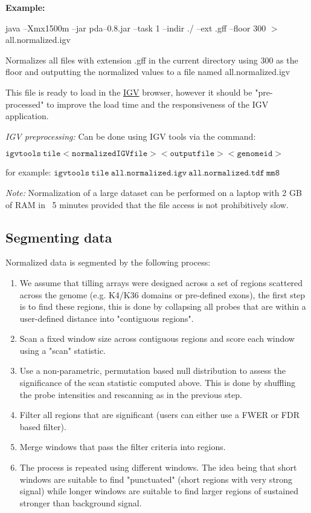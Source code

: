 \documentclass[11pt]{article}
\begin{document}
{\bf Example:}


java --Xmx1500m  --jar pda--0.8.jar --task 1 --indir ./ --ext .gff --floor 300 $>$ all.normalized.igv

Normalizes all files with extension .gff in the current directory using 300 as the floor and outputting the normalized values to a file named all.normalized.igv

This file is ready to load in the  \href{http://www.broadinstitute.org/igv/}{IGV}  browser, however it should be "pre-processed" to improve the load time and the responsiveness of the IGV application.

{\em IGV preprocessing:} Can be done using IGV tools via the command:

$\mathtt{igvtools\ tile <normalized IGV file> <output file> <genome id>} $  

for example:
$\mathtt{igvtools\ tile\ all.normalized.igv\ all.normalized.tdf\ mm8} $ 

{\em Note:} Normalization of a large dataset can be performed on a laptop with 2 GB of RAM in ~5 minutes provided that the file access is not prohibitively slow.

\subsection{Segmenting data}

Normalized data is segmented by the following process:
\begin{enumerate}
\item We assume that tilling arrays were designed across a set of regions scattered across the genome (e.g. K4/K36 domains or pre-defined exons), the first step is to find these regions, this is done by collapsing all probes that are within a user-defined distance into "contiguous regions". 
\item Scan a fixed window size across contiguous regions and score each window using a "scan" statistic.
\item Use a non-parametric, permutation based null distribution to assess the significance of the scan statistic computed above. This is done by shuffling the probe intensities and rescanning as in the previous step.
\item Filter all regions that are significant (users can either use a FWER or FDR based filter).
\item Merge windows that pass the filter criteria into regions.
\item The process is repeated using different windows. The idea being that short windows are suitable to find "punctuated" (short regions with very strong signal) while longer windows are suitable to find larger regions of sustained stronger than background signal.
\end{enumerate}
\end{document}
